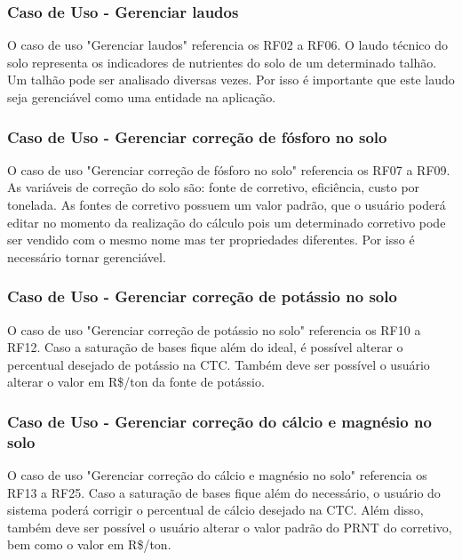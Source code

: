 \subsubsection{Caso de Uso - Gerenciar laudos}
\label{sec:titSecCasoUsoLaudos}

O caso de uso "Gerenciar laudos" referencia os RF02 a RF06. O laudo técnico do solo representa os indicadores de nutrientes do solo de um determinado talhão. Um talhão pode ser analisado diversas vezes. Por isso é importante que este laudo seja gerenciável como uma entidade na aplicação.

\subsubsection{Caso de Uso - Gerenciar correção de fósforo no solo}
\label{sec:titSecCasoUsoFosforo}

O caso de uso "Gerenciar correção de fósforo no solo" referencia os RF07 a RF09. As variáveis de correção do solo são: fonte de corretivo, eficiência, custo por tonelada. As fontes de corretivo possuem um valor padrão, que o usuário poderá editar no momento da realização do cálculo pois um determinado corretivo pode ser vendido com o mesmo nome mas ter propriedades diferentes. Por isso é necessário tornar gerenciável.

\subsubsection{Caso de Uso - Gerenciar correção de potássio no solo}
\label{sec:titSecCasoUsoPotassio}

O caso de uso "Gerenciar correção de potássio no solo" referencia os RF10 a RF12. Caso a saturação de bases fique além do ideal, é possível alterar o percentual desejado de potássio na CTC. Também deve ser possível o usuário alterar o valor em R\$/ton da fonte de potássio.

\subsubsection{Caso de Uso - Gerenciar correção do cálcio e magnésio no solo}
\label{sec:titSecCasoUsoCalcioMagnesio}

O caso de uso "Gerenciar correção do cálcio e magnésio no solo" referencia os RF13 a RF25. Caso a saturação de bases fique além do necessário, o usuário do sistema poderá corrigir o percentual de cálcio desejado na CTC. Além disso, também deve ser possível o usuário alterar o valor padrão do PRNT do corretivo, bem como o valor em R\$/ton.